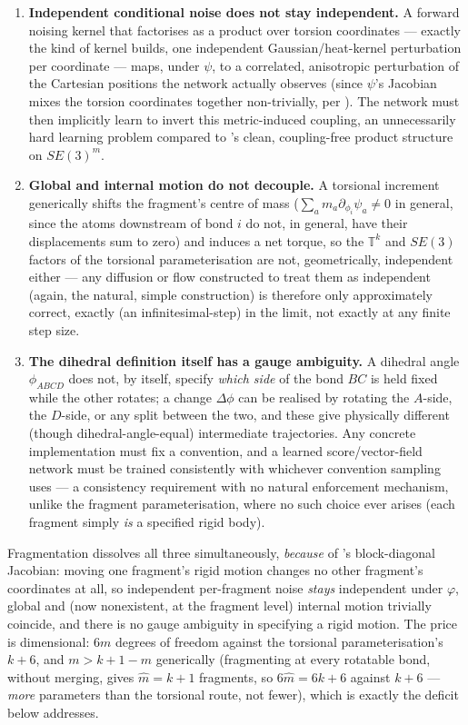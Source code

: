 \documentclass[11pt,a4paper]{report}
\theoremstyle{definition}
\theoremstyle{remark}
\begin{document}
\begin{enumerate}
\item \textbf{Independent conditional noise does not stay independent.} A
forward noising kernel that factorises as a product over torsion
coordinates --- exactly the kind of kernel  builds,
one independent Gaussian/heat-kernel perturbation per coordinate --- maps,
under $\psi$, to a correlated, anisotropic perturbation of the Cartesian
positions the network actually observes (since $\psi$'s Jacobian mixes the
torsion coordinates together non-trivially, per
). The network must then implicitly learn
to invert this metric-induced coupling, an unnecessarily hard learning
problem compared to 's clean, coupling-free product
structure on $SE(3)^m$.
\item \textbf{Global and internal motion do not decouple.} A torsional
increment generically shifts the fragment's centre of mass
($\sum_am_a\partial_{\phi_i}\psi_a\ne0$ in general, since the atoms
downstream of bond $i$ do not, in general, have their displacements sum to
zero) and induces a net torque, so the $\mathbb T^k$ and $SE(3)$ factors of
the torsional parameterisation are not, geometrically, independent either
--- any diffusion or flow constructed to treat them as independent (again,
the natural, simple construction) is therefore only approximately correct,
exactly (an infinitesimal-step) in the limit, not exactly at any finite
step size.
\item \textbf{The dihedral definition itself has a gauge ambiguity.} A
dihedral angle $\phi_{ABCD}$ does not, by itself, specify \emph{which side}
of the bond $BC$ is held fixed while the other rotates; a change
$\Delta\phi$ can be realised by rotating the $A$-side, the $D$-side, or any
split between the two, and these give physically different (though
dihedral-angle-equal) intermediate trajectories. Any concrete
implementation must fix a convention, and a learned score/vector-field
network must be trained consistently with whichever convention sampling
uses --- a consistency requirement with no natural enforcement mechanism,
unlike the fragment parameterisation, where no such choice ever arises
(each fragment simply \emph{is} a specified rigid body).
\end{enumerate}

Fragmentation dissolves all three simultaneously, \emph{because} of
's block-diagonal Jacobian: moving one
fragment's rigid motion changes no other fragment's coordinates at all, so
independent per-fragment noise \emph{stays} independent under $\varphi$,
global and (now nonexistent, at the fragment level) internal motion trivially
coincide, and there is no gauge ambiguity in specifying a rigid motion. The
price is dimensional: $6m$ degrees of freedom against the torsional
parameterisation's $k+6$, and $m>k+1-m$ generically (fragmenting at every
rotatable bond, without merging, gives $\hat m=k+1$ fragments, so $6\hat m=6k+6$
against $k+6$ --- \emph{more} parameters than the torsional route, not
fewer), which is exactly the deficit  below
addresses.
\end{document}
